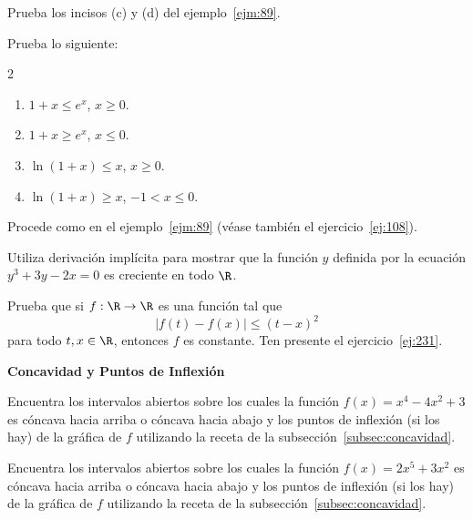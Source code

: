 \documentclass[12pt,a4paper]{book}
\newcommand{\subtitulo}[1]{\par\avoidorphan{5}\addvspace{\medskipamount}\noindent\textbf{#1}\par\nobreak}
\begin{document}
    \begin{ejercicio}\label{ej:275}
        Prueba los incisos (c) y (d) del ejemplo~\ref{ejm:89}.
    \end{ejercicio}

    \begin{ejercicio}\label{ej:276}
        Prueba lo siguiente:
        \begin{multicols}{2}
        \begin{enumerate}[nosep]
            \item $1+x\leq e^{x}$, $x\geq 0$.
            \item $1+x\geq e^{x}$, $x\leq 0$.
            \item $\ln(1+x)\leq x$, $x\geq 0$.
            \item $\ln(1+x)\geq x$, $-1<x\leq 0$.
        \end{enumerate}
        \end{multicols}
        \sugerencia Procede como en el ejemplo~\ref{ejm:89} (véase también el ejercicio~\ref{ej:108}).
    \end{ejercicio}

    \begin{ejercicio}\label{ej:277}
        Utiliza derivación implícita para mostrar que la función $y$
        definida por la ecuación $y^{3}+3y-2x=0$ es creciente en todo $\R$.
    \end{ejercicio}

    \begin{ejercicio}\label{ej:278}
        Prueba que si $f:\R\to\R$ es una función tal que
        \begin{equation*}
            |f(t)-f(x)|\leq(t-x)^{2}
        \end{equation*}
        para todo $t,x\in\R$, entonces $f$ es constante. \sugerencia Ten presente el
        ejercicio~\ref{ej:231}.
    \end{ejercicio}

    \subtitulo{Concavidad y Puntos de Inflexión}

    \begin{ejercicio}\label{ej:279}
        Encuentra los intervalos abiertos sobre los cuales la función
        $f(x)=x^{4}-4x^{2}+3$ es cóncava hacia arriba o cóncava hacia abajo y los
        puntos de inflexión (si los hay) de la gráfica de $f$ utilizando la receta de la
        subsección~\ref{subsec:concavidad}.
    \end{ejercicio}

    \begin{ejercicio}\label{ej:280}
        Encuentra los intervalos abiertos sobre los cuales la función
        $f(x)=2x^{5}+3x^{2}$ es cóncava hacia arriba o cóncava hacia abajo y los puntos
        de inflexión (si los hay) de la gráfica de $f$ utilizando la receta de la subsección~\ref{subsec:concavidad}.
    \end{ejercicio}
\end{document}
